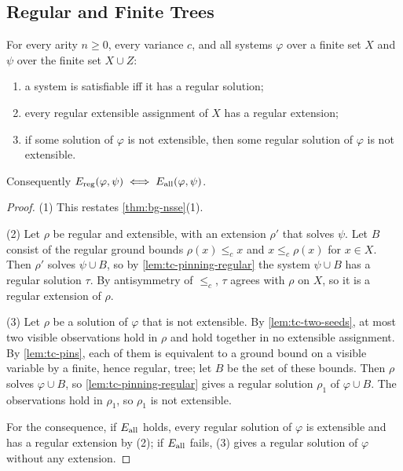 \subsection{Regular and Finite Trees}\label{sec:tc-transfer}

\begin{theorem}\label{thm:tc-regular}
For every arity $n\ge0$, every variance $c$, and all systems $\varphi$ over
a finite set $X$ and $\psi$ over the finite set $X\cup Z$:
\begin{enumerate}[leftmargin=*]
\item a system is satisfiable iff it has a regular solution;
\item every regular extensible assignment of $X$ has a regular extension;
\item if some solution of $\varphi$ is not extensible, then some regular
  solution of $\varphi$ is not extensible.
\end{enumerate}
Consequently $E_{\mathrm{reg}}(\varphi,\psi)\iff E_{\mathrm{all}}(\varphi,\psi)$.
\end{theorem}

\begin{proof}
(1) This restates \cref{thm:bg-nsse}(1).

(2) Let $\rho$ be regular and extensible, with an extension $\rho'$ that solves
$\psi$. Let $B$ consist of the regular ground bounds $\rho(x)\le_cx$ and
$x\le_c\rho(x)$ for $x\in X$. Then $\rho'$ solves $\psi\cup B$, so by
\cref{lem:tc-pinning-regular} the system $\psi\cup B$ has a regular solution
$\tau$. By antisymmetry of $\le_c$, $\tau$ agrees with $\rho$ on $X$, so it is a
regular extension of $\rho$.

(3) Let $\rho$ be a solution of $\varphi$ that is not extensible. By
\cref{lem:tc-two-seeds}, at most two visible observations hold in $\rho$ and
hold together in no extensible assignment. By \cref{lem:tc-pins}, each of them
is equivalent to a ground bound on a visible variable by a finite, hence
regular, tree; let $B$ be the set of these bounds. Then $\rho$ solves
$\varphi\cup B$, so \cref{lem:tc-pinning-regular} gives a regular solution
$\rho_1$ of $\varphi\cup B$. The observations hold in $\rho_1$, so $\rho_1$ is
not extensible.

For the consequence, if $E_{\mathrm{all}}$ holds, every regular solution of $\varphi$ is
extensible and has a regular extension by (2); if $E_{\mathrm{all}}$ fails, (3) gives a
regular solution of $\varphi$ without any extension.
\end{proof}

